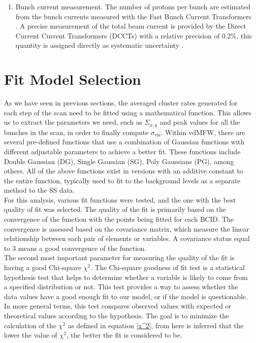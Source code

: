 \begin{enumerate}
\item Bunch current measurement. The number of protons per bunch are estimated from the bunch currents measured with the Fast Bunch Current Transformers \cite{LHC_bunch_populations}. A precise measurement of the total beam current is provided by the Direct Current Current Transformers (DCCTs) with a relative precision of 0.2\%, this quantity is assigned directly as systematic uncertainty \cite{DCCT_calibration_studies}. \\

\end{enumerate}

\section{Fit Model  Selection}

As we have seen in previous sections, the averaged cluster rates generated for each step of the scan need to be fitted using a mathematical function. This allows us to extract the parameters we need, such as $\Sigma_{x,y}$ and peak values for all the bunches in the scan, in order to finally compute $\sigma_{\text{vis}}$. Within vdMFW, there are several pre-defined functions that use a combination of Gaussian functions with different adjustable parameters to achieve a better fit. These functions include Double Gaussian (DG), Single Gaussian (SG), Poly Gaussians (PG), among others. All of the above functions exist in versions with an additive constant to the entire function, typically used to fit to the background levels as a separate method to the SS data.\\

For this analysis, various fit functions were tested, and the one with the best quality of fit was selected. The quality of the fit is primarily based on the convergence of the function with the points being fitted for each BCID. The convergence is assessed based on the covariance matrix, which measure the linear relationship between each pair of elements or variables. A  covariance status equal to 3 means a good convergence of the function.\\ 

The second most important parameter for measuring the quality of the fit is having a good  Chi-square $\chi^2$.  The  Chi-square goodness of fit test is a statistical hypothesis test that helps to determine whether a variable is likely to come from a specified distribution or not. This test provides a way to assess whether the data values have a good enough fit to our model, or if the model is questionable. In more general terms, this test compares observed values with expected or theoretical values according to the hypothesis. The goal is to minimize the calculation of the $\chi^2$ as defined in equation \ref{x^2}, from here is  inferred that the lower the value of $\chi^2$, the better the fit is considered to be.

